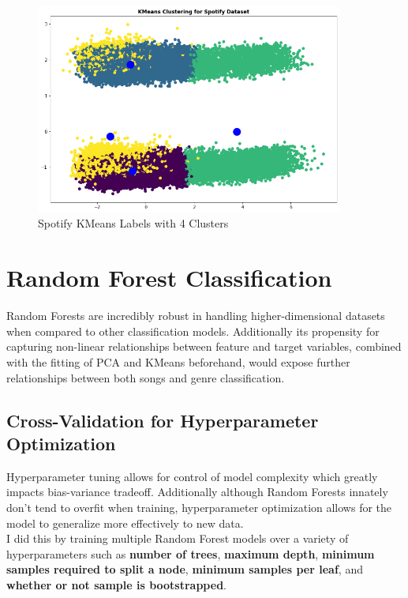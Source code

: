 \documentclass[12pt]{article}
\begin{document}
\begin{figure}[htbp]
  \centering
  \vspace{-0.075cm}
  \includegraphics[width=0.9\textwidth]{kmeans_clustering.png}
  \caption{Spotify KMeans Labels with 4 Clusters}
  \label{Spotify KMeans labeling}
\end{figure}

\section{Random Forest Classification}
Random Forests are incredibly robust in handling higher-dimensional datasets when compared to other classification models. Additionally its propensity for capturing non-linear relationships between feature and target variables, combined with the fitting of PCA and KMeans beforehand, would expose further relationships between both songs and genre classification. 

\subsection*{Cross-Validation for Hyperparameter Optimization}
Hyperparameter tuning allows for control of model complexity which greatly impacts bias-variance tradeoff. Additionally although Random Forests innately don't tend to overfit when training, hyperparameter optimization allows for the model to generalize more effectively to new data. \\

\noindent
I did this by training multiple Random Forest models over a variety of hyperparameters such as \textbf{number of trees}, \textbf{maximum depth}, \textbf{minimum samples required to split a node}, \textbf{minimum samples per leaf}, and \textbf{whether or not sample is bootstrapped}. \\ 
\end{document}
